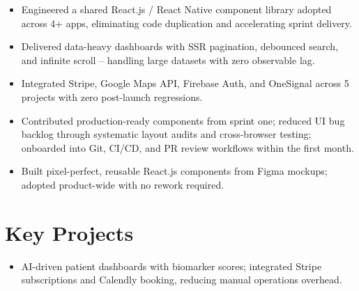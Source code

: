 \documentclass{resume}
\begin{document}
    \vspace{1pt}

    \begin{itemize}
      \item Engineered a shared React.js / React Native component library adopted across 4+ apps, eliminating code duplication and accelerating sprint delivery.
      \item Delivered data-heavy dashboards with SSR pagination, debounced search, and infinite scroll -- handling large datasets with zero observable lag.
      \item Integrated Stripe, Google Maps API, Firebase Auth, and OneSignal across 5 projects with zero post-launch regressions.
    \end{itemize}
    
    \vspace{1pt}

    \begin{itemize}
      \item Contributed production-ready components from sprint one; reduced UI bug backlog through systematic layout audits and cross-browser testing; onboarded into Git, CI/CD, and PR review workflows within the first month.
    \end{itemize}
    
    \vspace{1pt}

    
    \begin{itemize}
      \item Built pixel-perfect, reusable React.js components from Figma mockups; adopted product-wide with no rework required.
    \end{itemize}
    
    \section{Key Projects}
    
    \begin{itemize}
      \item AI-driven patient dashboards with biomarker scores; integrated Stripe subscriptions and Calendly booking, reducing manual operations overhead.
    \end{itemize}
    
\end{document}
